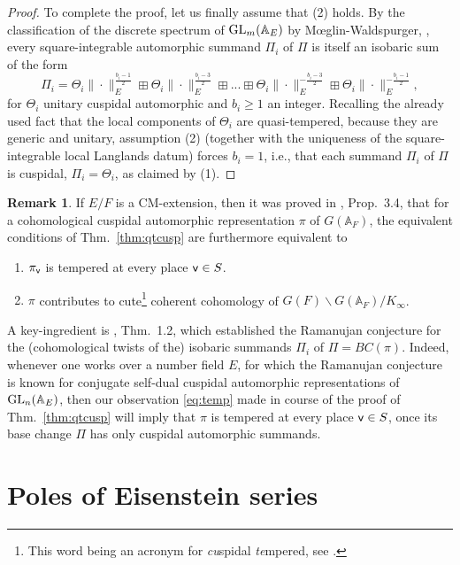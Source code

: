 \documentclass[a4paper,10pt]{amsart}
\theoremstyle{definition}
\newtheorem{rmk}[equation]{Remark}
\numberwithin{equation}{section}
\def\A{\mathbb A}
\def\GL{{\rm GL}}
\def\vv{{\sf v}} %
\begin{document}
\begin{proof}
To complete the proof, let us finally assume that (2) holds. By the classification of the discrete spectrum of $\GL_m(\A_E)$ by M\oe glin-Waldspurger, \cite{MW}, every square-integrable automorphic summand $\Pi_i$ of $\Pi$ is itself an isobaric sum of the form 
$$\Pi_i=\Theta_i \|\cdot \|_E^{\tfrac{b_i-1}{2}}\boxplus \Theta_i \|\cdot \|_E^{\tfrac{b_i-3}{2}} \boxplus ...\boxplus \Theta_i \|\cdot \|_E^{-\tfrac{b_i-3}{2}} \boxplus\Theta_i \|\cdot \|_E^{-\tfrac{b_i-1}{2}},$$ 
for $\Theta_i$ unitary cuspidal automorphic and $b_i\geq 1$ an integer. Recalling the already used fact that the local components of $\Theta_i$ are quasi-tempered, because they are generic and unitary, assumption (2) (together with the uniqueness of the square-integrable local Langlands datum) forces $b_i=1$, i.e., that each summand $\Pi_i$ of $\Pi$ is cuspidal, $\Pi_i=\Theta_i$, as claimed by (1).
 \end{proof}

\begin{rmk}
If $E/F$ is a CM-extension, then it was proved in \cite{GHL}, Prop.\ 3.4, that for a cohomological cuspidal automorphic representation $\pi$ of $G(\A_F)$, the equivalent conditions of Thm.\ \ref{thm:qtcusp} are furthermore equivalent to
\begin{enumerate}
\item[(4)] $\pi_\vv$ is tempered at every place $\vv\in S$. 
\item[(5)] $\pi$ contributes to cute\footnote{This word being an acronym for {\it cu}spidal {\it te}mpered, see \cite{GHL}.} coherent cohomology of $G(F)\backslash G(\A_F)/K_\infty$.
\end{enumerate}
A key-ingredient is \cite{car}, Thm.\ 1.2, which established the Ramanujan conjecture for the (cohomological twists of the) isobaric summands $\Pi_i$ of $\Pi=BC(\pi)$. Indeed, whenever one works over a number field $E$, for which the Ramanujan conjecture is known for conjugate self-dual cuspidal automorphic representations of $\GL_n(\A_E)$, then our observation \eqref{eq:temp} made in course of the proof of Thm.\ \ref{thm:qtcusp} will imply that $\pi$ is tempered at every place $\vv\in S$, once its base change $\Pi$ has only cuspidal automorphic summands.
\end{rmk}


\section{Poles of Eisenstein series}
\end{document}
